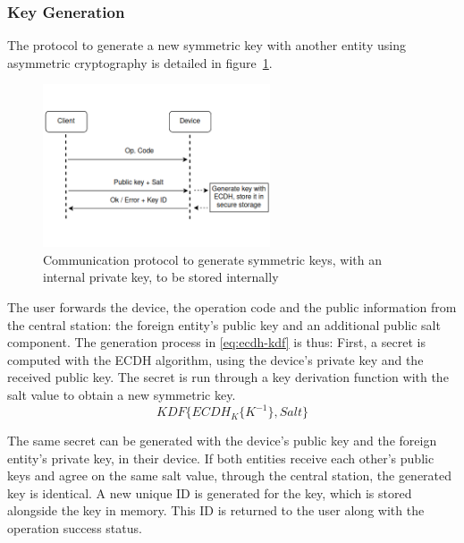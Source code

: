 \subsubsection{Key Generation}\label{chap:arch:services:new-comms:ecdh}

The protocol to generate a new symmetric key with another entity using asymmetric cryptography is detailed in figure~\ref{fig:protocol:ecdh}.
\begin{figure}[h!]
	\centering
	\includegraphics[width=0.60\textwidth]{./Images/ecdh.png}
	\caption{Communication protocol to generate symmetric keys, with an internal private key, to be stored internally}
	\label{fig:protocol:ecdh}
\end{figure}

The user forwards the device, the operation code and the public information from the central station: the foreign entity's public key and an additional public salt component.
The generation process in \ref{eq:ecdh-kdf} is thus: First, a secret is computed with the \ac{ECDH} algorithm, using the device's private key and the received public key. The secret is run through a key derivation function with the salt value to obtain a new symmetric key.
\begin{equation}
	\label{eq:ecdh-kdf}
	KDF\{ECDH_{K}\{K^{-1}\}, Salt\}
\end{equation}

The same secret can be generated with the device's public key and the foreign entity's private key, in their device. If both entities receive each other's public keys and agree on the same salt value, through the central station, the generated key is identical.
A new unique ID is generated for the key, which is stored alongside the key in memory. This ID is returned to the user along with the operation success status.

